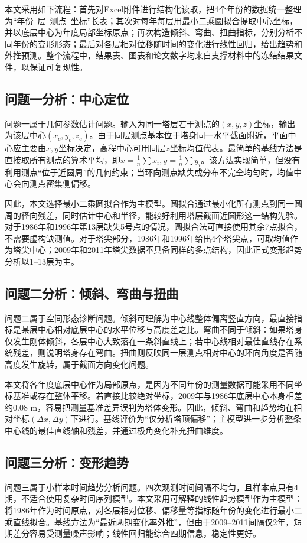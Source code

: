 \documentclass[UTF8,a4paper,12pt]{ctexart}
\begin{document}
本文采用如下流程：首先对Excel附件进行结构化读取，把4个年份的数据统一整理为“年份--层--测点--坐标”长表；其次对每年每层用最小二乘圆拟合提取中心坐标，并以底层中心为年度局部坐标原点；再次构造倾斜、弯曲、扭曲指标，分别分析不同年份的变形形态；最后对各层相对位移随时间的变化进行线性回归，给出趋势和外推预测。整个流程中，结果表、图表和论文数字均来自支撑材料中的冻结结果文件，以保证可复现性。

\subsection{问题一分析：中心定位}
问题一属于几何参数估计问题。输入为同一塔层若干测点的$(x,y,z)$坐标，输出为该层中心$(x_c,y_c,z_c)$。由于同层测点基本位于塔身同一水平截面附近，平面中心应主要由$x,y$坐标决定，高程中心可用同层$z$坐标均值代表。最简单的基线方法是直接取所有测点的算术平均，即$\bar{x}=\frac1n\sum x_i,\bar{y}=\frac1n\sum y_i$。该方法实现简单，但没有利用测点“位于近圆周”的几何约束；当环向测点缺失或分布不完全均匀时，均值中心会向测点密集侧偏移。

因此，本文选择最小二乘圆拟合作为主模型。圆拟合通过最小化所有测点到同一圆周的径向残差，同时估计中心和半径，能较好利用塔层截面近圆形这一结构先验。对于1986年和1996年第13层缺失5号点的情况，圆拟合法可直接使用其余7点拟合，不需要虚构缺测值。对于塔尖部分，1986年和1996年给出4个塔尖点，可取均值作为塔尖中心；2009年和2011年塔尖数据不具备同样的多点结构，因此正式变形趋势分析以1--13层为主。

\subsection{问题二分析：倾斜、弯曲与扭曲}
问题二属于空间形态诊断问题。倾斜可理解为中心线整体偏离竖直方向，最直接指标是某层中心相对底层中心的水平位移与高度差之比。弯曲不同于倾斜：如果塔身仅发生刚体倾斜，各层中心大致落在一条斜直线上；若中心线相对最佳直线存在系统残差，则说明塔身存在弯曲。扭曲则反映同一层测点相对中心的环向角度是否随高度发生旋转，属于截面方向变化问题。

本文将各年度底层中心作为局部原点，是因为不同年份的测量数据可能采用不同坐标基准或存在整体平移。若直接比较绝对坐标，2009年与1986年底层中心本身相差约0.08 m，容易把测量基准差异误判为塔体变形。因此，倾斜、弯曲和趋势均在相对坐标$(\Delta x,\Delta y)$下进行。基线评价为“仅分析塔顶偏移”；主模型进一步分析整条中心线的最佳直线轴和残差，并通过极角变化补充扭曲维度。

\subsection{问题三分析：变形趋势}
问题三属于小样本时间趋势分析问题。四次观测时间间隔不均匀，且样本点只有4期，不适合使用复杂时间序列模型。本文采用可解释的线性趋势模型作为主模型：将1986年作为时间原点，对各层相对位移、偏移量等指标随年份的变化进行最小二乘直线拟合。基线方法为“最近两期变化率外推”，但由于2009--2011间隔仅2年，短期差分容易受测量噪声影响；线性回归能综合四期信息，稳定性更好。
\end{document}
